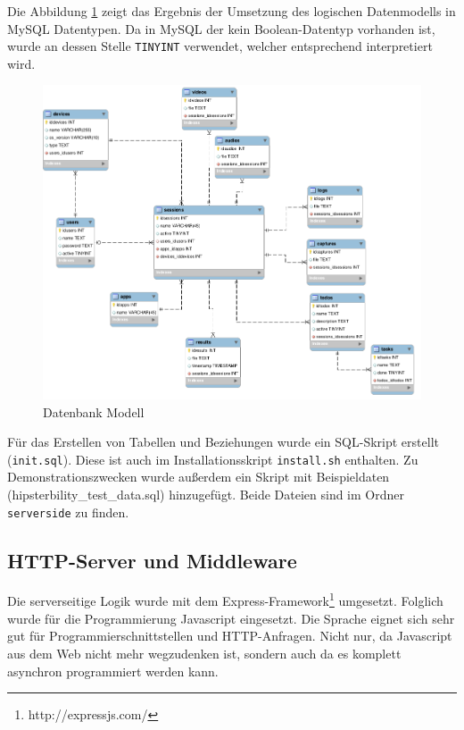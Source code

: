 Die Abbildung \ref{figure-db-model} zeigt das Ergebnis der Umsetzung des logischen Datenmodells in MySQL Datentypen.
Da in MySQL der kein Boolean-Datentyp vorhanden ist, wurde an dessen Stelle \texttt{TINYINT} verwendet, welcher entsprechend interpretiert wird.

\begin{figure}[h!]
	\centering
	\includegraphics[width=\linewidth,keepaspectratio]{img/db_model.png}
	\caption{Datenbank Modell}
	\label{figure-db-model}
\end{figure}

Für das Erstellen von Tabellen und Beziehungen wurde ein \ac{SQL}-Skript erstellt (\texttt{init.sql}).
Diese ist auch im Installationsskript \texttt{install.sh} enthalten.
Zu Demonstrationszwecken wurde außerdem ein Skript mit Beispieldaten (hipsterbility\_test\_data.sql) hinzugefügt.
Beide Dateien sind im Ordner \texttt{serverside} zu finden.


\subsection{HTTP-Server und Middleware}
Die serverseitige Logik wurde mit dem Express-Framework\footnote{http://expressjs.com/} umgesetzt. 
Folglich wurde für die Programmierung Javascript eingesetzt. Die Sprache eignet sich sehr gut für Programmierschnittstellen und HTTP-Anfragen. 
Nicht nur, da Javascript aus dem Web nicht mehr wegzudenken ist, sondern auch da es komplett asynchron programmiert werden kann. 


